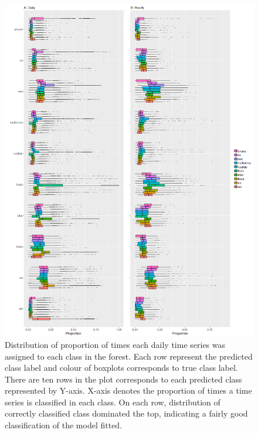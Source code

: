 \documentclass[11pt,a4paper,]{article}
\begin{document}
\begin{figure}
\centering
\includegraphics{figures/oobdailyhourly-1.png}
\caption{\label{fig:oobdailyhourly}Distribution of proportion of times each
daily time series was assigned to each class in the forest. Each row
represent the predicted class label and colour of boxplots corresponds
to true class label. There are ten rows in the plot corresponds to each
predicted class represented by Y-axis. X-axis denotes the proportion of
times a time series is classified in each class. On each row,
distribution of correctly classified class dominated the top, indicating
a fairly good classification of the model fitted.}
\end{figure}

\newpage
\end{document}
